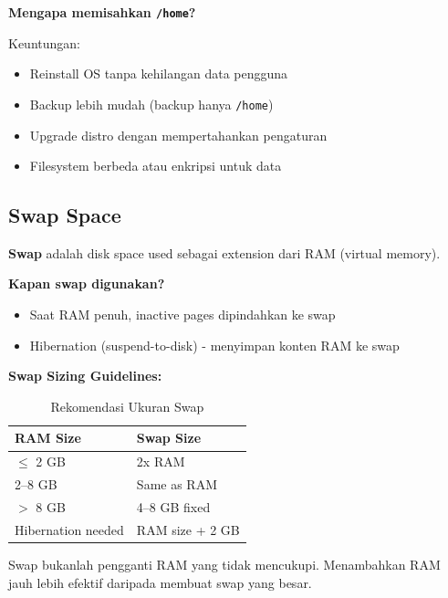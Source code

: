 \begin{tipbox}
\textbf{Mengapa memisahkan \texttt{/home}?}

Keuntungan:
\begin{itemize}
    \item Reinstall OS tanpa kehilangan data pengguna
    \item Backup lebih mudah (backup hanya \texttt{/home})
    \item Upgrade distro dengan mempertahankan pengaturan
    \item Filesystem berbeda atau enkripsi untuk data
\end{itemize}
\end{tipbox}

\subsection{Swap Space}

\textbf{Swap} adalah disk space used sebagai extension dari RAM (virtual memory).

\textbf{Kapan swap digunakan?}
\begin{itemize}
    \item Saat RAM penuh, inactive pages dipindahkan ke swap
    \item Hibernation (suspend-to-disk) - menyimpan konten RAM ke swap
\end{itemize}

\textbf{Swap Sizing Guidelines:}

\begin{table}[htbp]
    \centering
    \caption{Rekomendasi Ukuran Swap}
    \label{tab:swap-sizing}
    \begin{tabular}{@{}ll@{}}
        \toprule
        \textbf{RAM Size} & \textbf{Swap Size} \\
        \midrule
        $\leq$ 2 GB & 2x RAM \\
        2--8 GB & Same as RAM \\
        $>$ 8 GB & 4--8 GB fixed \\
        Hibernation needed & RAM size + 2 GB \\
        \bottomrule
    \end{tabular}
\end{table}

\begin{warningbox}
  Swap bukanlah pengganti RAM yang tidak mencukupi. Menambahkan RAM jauh lebih efektif daripada membuat swap yang besar.
\end{warningbox}

